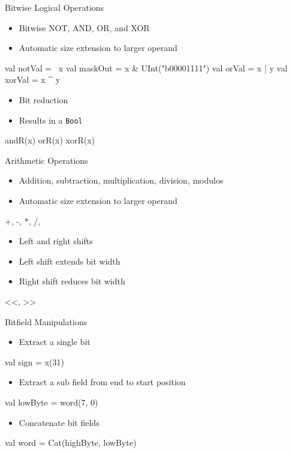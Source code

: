 \documentclass[xcolor=pdflatex,dvipsnames,table]{beamer}
\newcommand{\code}[1]{{\texttt{#1}}}
\begin{document}
\begin{frame}[fragile]{Bitwise Logical Operations}
\begin{itemize}
\item Bitwise NOT, AND, OR, and XOR
\item Automatic size extension to larger operand
\end{itemize}
\begin{chisel}
val notVal = ~x
val maskOut = x & UInt("b00001111")
val orVal = x | y
val xorVal = x ^ y
\end{chisel}
\begin{itemize}
\item Bit reduction
\item Results in a \code{Bool}
\end{itemize}
\begin{chisel}
andR(x)
orR(x)
xorR(x)
\end{chisel}
\end{frame}

\begin{frame}[fragile]{Arithmetic Operations}
\begin{itemize}
\item Addition, subtraction, multiplication, division, modulos
\item Automatic size extension to larger operand
\end{itemize}
\begin{chisel}
+, -, *, /, %
\end{chisel}
\begin{itemize}
\item Left and right shifts
\item Left shift extends bit width
\item Right shift reduces bit width
\end{itemize}
\begin{chisel}
<<, >>
\end{chisel}
\end{frame}

\begin{frame}[fragile]{Bitfield Manipulations}
\begin{itemize}
\item Extract a single bit
\end{itemize}
\begin{chisel}
val sign = x(31)
\end{chisel}
\begin{itemize}
\item Extract a sub field from end to start position
\end{itemize}
\begin{chisel}
val lowByte = word(7, 0)
\end{chisel}
\begin{itemize}
\item Concatenate bit fields
\end{itemize}
\begin{chisel}
val word = Cat(highByte, lowByte)
\end{chisel}
\end{frame}
\end{document}
